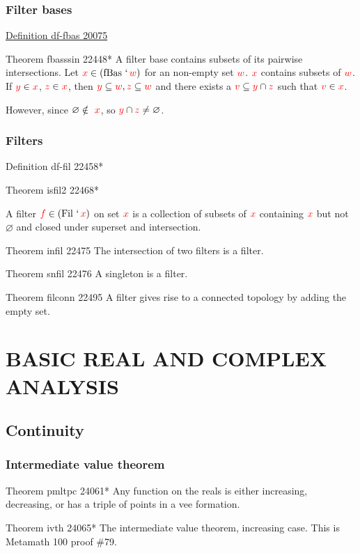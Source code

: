 \documentclass[12pt, letterpaper]{article}
\newcommand{\inters}[2][]{
	\ifthenelse { \equal {#1} {} }
	{ \bigcap{#2} } %
	{ {#1}\cap{#2} } %
}
\newcommand{\red}[1]{{\color{red} #1}}
\renewcommand{\emptyset}{\varnothing}
\newcommand{\setvar}{\red}
\newcommand{\sff}{\setvar{f}}
\newcommand{\sv}{\setvar{v}}
\newcommand{\sw}{\setvar{w}}
\newcommand{\sx}{\setvar{x}}
\newcommand{\sy}{\setvar{y}}
\newcommand{\sz}{\setvar{z}}
\newcommand{\at}{\,`\,}
\theoremstyle{definition}
\theoremstyle{remark}
\theoremstyle{definition}
\theoremstyle{plain}
\begin{document}
	\subsubsection{Filter bases}
	
	\href{https://us.metamath.org/mpeuni/df-fbas.html}{Definition df-fbas 20075}
	
	Theorem	fbasssin 22448*	A filter base contains subsets of its pairwise intersections.
	Let $\sx\in(\operatorname{fBas}\at\sw)$ for an non-empty set $\sw$. $\sx$ contains subsets of $\sw$. If $\sy\in\sx$, $\sz\in\sx$, then $\sy\subseteq\sw,\sz\subseteq\sw$ and there exists a $\sv\subseteq\inters[\sy]{\sz}$ such that $\sv\in\sx$.
	
	However, since $\emptyset \notin\ \sx$, so $\inters[\sy]{\sz}\ne\emptyset$.
	
	\subsubsection{Filters}
	
	Definition	df-fil 22458*
	
	Theorem	isfil2 22468*
	
	A filter $\sff\in(\operatorname{Fil}\at\sx)$ on set $\sx$ is a collection of subsets of $\sx$ containing $\sx$ but not $\emptyset$ and closed under superset and intersection.
	
	Theorem	infil 22475	The intersection of two filters is a filter. 
	
	Theorem	snfil 22476	A singleton is a filter. 
	
	Theorem	filconn 22495	A filter gives rise to a connected topology by adding the empty set.
	
	
	\section{BASIC REAL AND COMPLEX ANALYSIS}
	\subsection{Continuity}
	\subsubsection{Intermediate value theorem}
	Theorem	pmltpc 24061*	Any function on the reals is either increasing, decreasing, or has a triple of points in a vee formation.
	
	Theorem	ivth 24065*	The intermediate value theorem, increasing case. This is Metamath 100 proof \#79.
	
\end{document}
